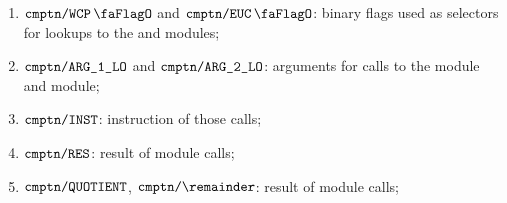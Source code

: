 \begin{enumerate}
	\item $\txnDataCmptnWcpFlag$ and $\txnDataCmptnEucFlag$:
		binary flags used as selectors for lookups
		to the \wcpMod{} and \eucMod{} modules;
	\item $\texttt{cmptn}\texttt{/}{\texttt{\texttt{ARG}\texttt{\_1}\texttt{\_LO}}}$ and $\texttt{cmptn}\texttt{/}{\texttt{\texttt{ARG}\texttt{\_2}\texttt{\_LO}}}$:
		arguments for calls to the \wcpMod{} module and \eucMod{} module;
	\item $\texttt{cmptn}\texttt{/}{\texttt{\texttt{INST}}}$:
		instruction of those calls;
	\item $\texttt{cmptn}\texttt{/}{\texttt{\texttt{RES}}}$:
		result of \wcpMod{} module calls;
	\item $\texttt{cmptn}\texttt{/}{\texttt{\texttt{QUOTIENT}}}$, $\txnDataCmptnEucRemainder$:
		result of \wcpMod{} module calls;
\end{enumerate}
